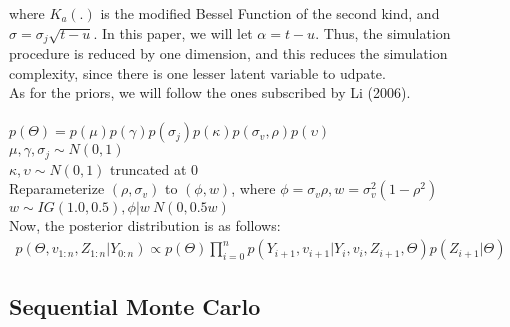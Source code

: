 \documentclass[11pt]{article}
\theoremstyle{definition}
\begin{document}
where $K_{a}(.)$ is the modified Bessel Function of the second kind, and $\sigma = \sigma_{j}\sqrt{t-u}$. In this paper, we will let $\alpha = t-u$. Thus, the simulation procedure is reduced by one dimension, and this reduces the simulation complexity, since there is one lesser latent variable to udpate. \\
As for the priors, we will follow the ones subscribed by Li (2006).\\
\\
$p(\Theta)=p(\mu)p(\gamma)p(\sigma_{j})p(\kappa)p(\sigma_v,\rho)p(\upsilon)$\\
$\mu,\gamma,\sigma_{j} \sim N(0,1)$\\
$\kappa,\upsilon \sim N(0,1)$ truncated at 0\\
Reparameterize $(\rho,\sigma_{v})$ to $(\phi,w)$, where $\phi = \sigma_{v} \rho , w = \sigma_{v}^{2}(1-\rho^{2})$\\
$w \sim IG(1.0,0.5), \phi | w ~ N(0,0.5w)$\\

\noindent Now, the posterior distribution is as follows:
\begin{equation}
\begin{aligned}
p(\Theta,v_{1:n},Z_{1:n}|Y_{0:n}) \propto p(\Theta) \prod_{i=0}^{n} p(Y_{i+1},v_{i+1}|Y_{i},v_{i},Z_{i+1},\Theta)p(Z_{i+1}|\Theta)
\end{aligned}
\end{equation}
\subsection{Sequential Monte Carlo}
\end{document}
